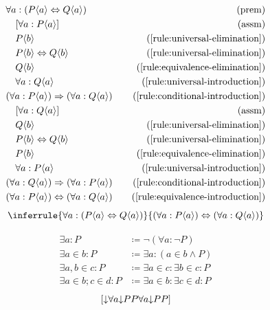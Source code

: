 \begin{align*}
    \premise{\forall a: (P\bound{a} \lequiv Q\bound{a})}\\
    \assumption[1]{\forall a: P\bound{a}}\\
    \byrule[1]{P\bound{b}}{\ref{rule:universal-elimination}}\\
    \byrule[1]{P\bound{b} \lequiv Q\bound{b}}{\ref{rule:universal-elimination}}\\
    \byrule[1]{Q\bound{b}}{\ref{rule:equivalence-elimination}}\\
    \byrule[1]{\forall a: Q\bound{a}}{\ref{rule:universal-introduction}}\\
    \byrule{(\forall a: P\bound{a}) \implies (\forall a: Q\bound{a})}{\ref{rule:conditional-introduction}}\\
    \assumption[1]{\forall a: Q\bound{a}}\\
    \byrule[1]{Q\bound{b}}{\ref{rule:universal-elimination}}\\
    \byrule[1]{P\bound{b} \lequiv Q\bound{b}}{\ref{rule:universal-elimination}}\\
    \byrule[1]{P\bound{b}}{\ref{rule:equivalence-elimination}}\\
    \byrule[1]{\forall a: P\bound{a}}{\ref{rule:universal-introduction}}\\
    \byrule{(\forall a: Q\bound{a}) \implies (\forall a: P\bound{a})}{\ref{rule:conditional-introduction}}\\
    \byrule{(\forall a: P\bound{a}) \lequiv (\forall a: Q\bound{a})}{\ref{rule:equivalence-introduction}}
\end{align*}
\begin{equation}
    \inferrule{\forall a: (P\bound{a} \lequiv Q\bound{a})}{(\forall a: P\bound{a}) \lequiv (\forall a: Q\bound{a})}
    \label{rule:universal-congruence}
\end{equation}

\newcommand{\norexists}[2]{\norneg{\norforall{#1}{\norneg{#2}}}} %
\begin{notation}
    \begin{align*}
        \exists a: P &\coloneqq \neg(\forall a: \neg P) \\ %
        \exists a \in b: P &\coloneqq \exists a: (a \in b \wedge P) \\
        \exists a, b \in c: P &\coloneqq \exists a \in c: \exists b \in c: P \\
        \exists a \in b; c \in d: P &\coloneqq \exists a \in b: \exists c \in d: P
    \end{align*}
    \[[\norexists{a}{P}]\]
\end{notation}

